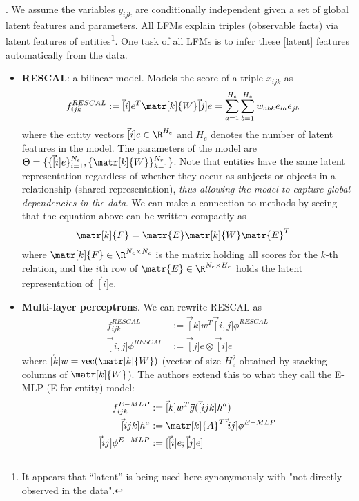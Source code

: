 \documentclass[11pt]{article}
\begin{document}
\myspace
\p {}. We assume the variables $y_{ijk}$ are conditionally independent given a set of global latent features and parameters. All LFMs explain triples (observable facts) via latent features of entities\footnote{It appears that ``latent'' is being used here synonymously with "not directly observed in the data".}. One task of all LFMs is to infer these [latent] features automatically from the data.
\begin{itemize}
	\item \textbf{RESCAL}: a bilinear model. Models the score of a triple $x_{ijk}$ as 
	\begin{align}
	f_{ijk}^{RESCAL}
	&:= \vec[i]{e}^T \matr[k]{W} \vec[j]{e} = \sum_{a = 1}^{H_e} \sum_{b = 1}^{H_e} w_{abk} e_{ia} e_{jb}
	\end{align}
	where the entity vectors $\vec[i]{e} \in \R^{H_e}$ and $H_e$ denotes the number of latent features in the model. The parameters of the model are $\Theta = \{ \{  \vec[i]{e} \}_{i=1}^{N_e}, \{ \matr[k]{W} \}_{k = 1}^{N_r} \}$. Note that entities have the same latent representation regardless of whether they occur as subjects or objects in a relationship (shared representation), \textit{thus allowing the model to capture global dependencies in the data}. We can make a connection to  methods by seeing that the equation above can be written compactly as 
	\begin{align}
	\matr[k]{F} &= \matr{E} \matr[k]{W} \matr{E}^T
	\end{align}
	where $\matr[k]{F} \in \R^{N_e \times N_e}$ is the matrix holding all scores for the $k$-th relation, and the $i$th row of $\matr{E} \in \R^{N_e \times H_e}$ holds the latent representation of $\vec[i]{e}$.
	
	\item \textbf{Multi-layer perceptrons}. We can rewrite RESCAL as
	\begin{align}
	f_{ijk}^{RESCAL} &:= \vec[k]{w}^T \vec[i,j]{\phi}^{RESCAL} \\
	\vec[i,j]{\phi}^{RESCAL} &:= \vec[j]{e} \otimes \vec[i]{e}
	\end{align}
	where $\vec[k]{w} = \text{vec}(\matr[k]{W})$ (vector of size $H_e^2$ obtained by stacking columns of $\matr[k]{W}$). The authors extend this to what they call the E-MLP (E for entity) model:
	\begin{align}
	f_{ijk}^{E-MLP} &:= \vec[k]{w}^T \vec{g}(\vec[ijk]{h}^a) \\
	\vec[ijk]{h}^a &:= \matr[k]{A}^T \vec[ij]{\phi}^{E-MLP} \\
	\vec[ij]{\phi}^{E-MLP} &:= [\vec[i]{e}; \vec[j]{e}]
	\end{align}
\end{itemize}
\end{document}
